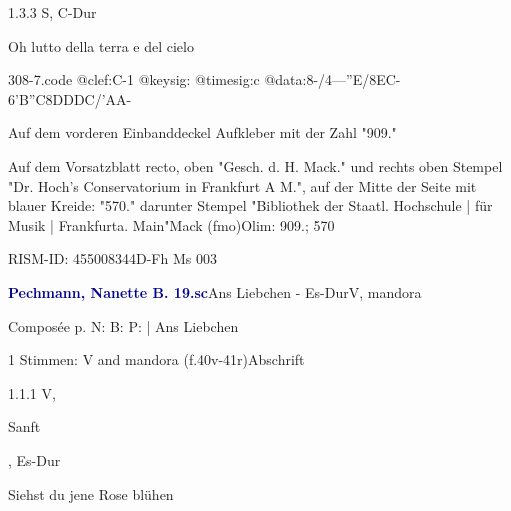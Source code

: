 \documentclass[twocolumn]{book}
\begin{document}
\newline
%
\par 1.3.3  S, C-Dur\newline \begin{footnotesize} Oh lutto della terra e del cielo \end{footnotesize}  
\begin{filecontents*}{308-7.code}
@clef:C-1
@keysig:
@timesig:c
@data:8-/4---''E/8EC-6'B''C8DDDC/'AA-
\end{filecontents*}
\newline
%
\par Auf dem vorderen Einbanddeckel Aufkleber mit der Zahl "909."
\par Auf dem Vorsatzblatt recto, oben "Gesch. d. H. Mack." und rechts oben Stempel "Dr. Hoch's Conservatorium in Frankfurt A M.", auf der Mitte der Seite mit blauer Kreide: "570." darunter Stempel "Bibliothek der Staatl. Hochschule | für Musik | Frankfurta. Main"\newline Mack  (fmo)\newline Olim: 909.; 570
\par RISM-ID: 455008344\newline D-Fh  Ms 003
\par \vspace{7pt} \textcolor{darkblue}{\textbf{Pechmann, Nanette B.  19.sc}}\hfillplus{\textbf{[309]}}\newline Ans Liebchen - Es-Dur\newline V, mandora
\par \begin{itshape}[heading, f.40v:] Composée p. N: B: P: | Ans Liebchen\end{itshape} 
\par \textcolor{darkblue}{}  1 Stimmen: V and mandora  (f.40v-41r)\newline Abschrift
\par 1.1.1  V, \begin{itshape}Sanft\end{itshape}, Es-Dur\newline \begin{footnotesize} Siehst du jene Rose blühen \end{footnotesize}  
\end{document}
